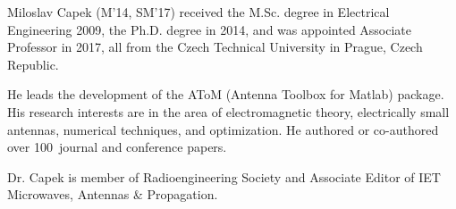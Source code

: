 \documentclass[journal]{IEEEtran}
\begin{document}
\begin{IEEEbiography}{Miloslav Capek}
(M'14, SM'17) received the M.Sc. degree in Electrical Engineering 2009, the Ph.D. degree in 2014, and was appointed Associate Professor in 2017, all from the Czech Technical University in Prague, Czech Republic.
	
He leads the development of the AToM (Antenna Toolbox for Matlab) package. His research interests are in the area of electromagnetic theory, electrically small antennas, numerical techniques, and optimization. He authored or co-authored over 100~journal and conference papers.

Dr. Capek is member of Radioengineering Society and Associate Editor of IET Microwaves, Antennas \& Propagation.
\end{IEEEbiography}
\end{document}
